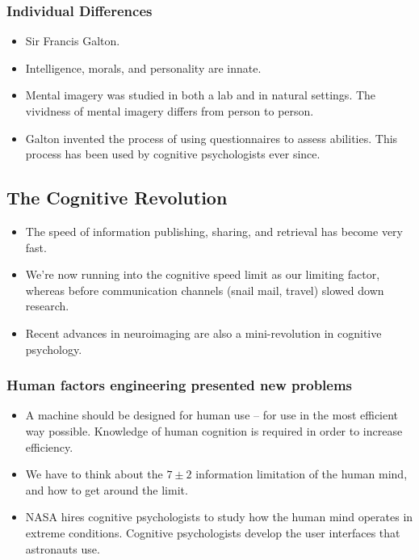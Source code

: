 \documentclass[]{article}
\begin{document}
			\subsubsection{Individual Differences}
				\begin{itemize}
					\item Sir Francis Galton.
					\item Intelligence, morals, and personality are innate.
					\item Mental imagery was studied in both a lab and in natural settings. The vividness of mental imagery differs from person to person.
					\item Galton invented the process of using questionnaires to assess abilities. This process has been used by cognitive psychologists ever since.
				\end{itemize}

		\subsection{The Cognitive Revolution}
			\begin{itemize}
				\item The speed of information publishing, sharing, and retrieval has become very fast.
				\item We're now running into the cognitive speed limit as our limiting factor, whereas before communication channels (snail mail, travel) slowed down research.
				\item Recent advances in neuroimaging are also a mini-revolution in cognitive psychology.
			\end{itemize}

			\subsubsection{Human factors engineering presented new problems}
				\begin{itemize}
					\item A machine should be designed for human use -- for use in the most efficient way possible. Knowledge of human cognition is required in order to increase efficiency.
					\item We have to think about the $7 \pm 2$ information limitation of the human mind, and how to get around the limit.
					\item NASA hires cognitive psychologists to study how the human mind operates in extreme conditions. Cognitive psychologists develop the user interfaces that astronauts use.
				\end{itemize}
\end{document}
